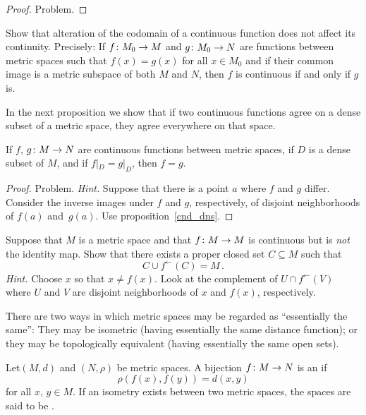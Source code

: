 \begin{proof} Problem.   \ns  \end{proof}

\begin{prob}  Show that alteration of the codomain of a continuous function does not affect its
continuity.  Precisely: If $f\colon M_0 \rightarrow M$ and $g\colon  M_0 \rightarrow N$ are functions between
metric spaces such that $f(x) = g(x)$ for all $x \in M_0$ and if their common image is a metric
subspace of both $M$ and $N$, then $f$ is continuous if and only if $g$ is.
\end{prob}

In the next proposition we show that if two continuous functions agree on a dense subset of a
metric space, they agree everywhere on that space.

\begin{prop}\label{agree_dense} If $f$, $g \colon M \rightarrow N$ are continuous functions between metric
spaces, if $D$ is a dense subset of $M$, and if $f|_D = g|_D$, then $f = g$.
\end{prop}

\begin{proof} Problem.  \emph{Hint.} Suppose that there is a point $a$ where $f$ and $g$ differ.
Consider the inverse images under $f$ and $g$, respectively, of disjoint neighborhoods of $f(a)$
and~$g(a)$.  Use proposition~\ref{cnd_dns}. \ns
\end{proof}

\begin{prob} Suppose that $M$ is a metric space and that $f\colon M \rightarrow M$ is continuous but
is \emph{not} the identity map.  Show that there exists a proper closed set $C \subseteq M$ such
that
  \[ C \cup f^\gets(C) = M\,. \]
\emph{Hint.} Choose $x$ so that $x \ne f(x)$.  Look at the complement of $U \cap f^\gets(V)$ where
$U$ and $V$ are disjoint neighborhoods of $x$ and $f(x)$, respectively.
\end{prob}

There are two ways in which metric spaces may be regarded as ``essentially the same'': They may be
isometric (having essentially the same distance function); or they may be topologically equivalent
(having essentially the same open sets).

\begin{defn} Let$(M,d)$ and $(N,\rho)$ be metric spaces.  A bijection $f \colon M \rightarrow N$ is an
 if
  \[ \rho(f(x),f(y)) = d(x,y) \]
for all $x$, $y \in M$. If an isometry exists between two metric spaces, the spaces are said
to be
.
\end{defn}

